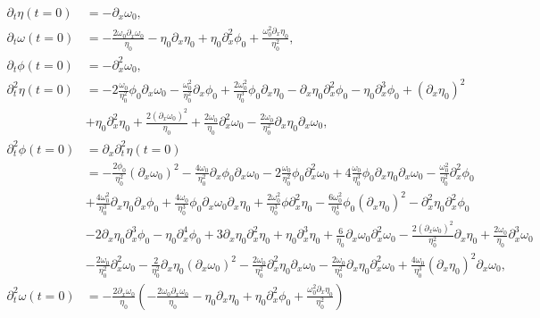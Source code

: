 \documentclass[reqno,11pt]{amsart}
\theoremstyle{plain}
\theoremstyle{definition}
\numberwithin{equation}{section}
\begin{document}
\begin{equation}
\label{initial_data_time}
\begin{aligned}
    \partial_t \eta(t=0) & = - \partial_x \omega_0,\\
    \partial_t \omega(t=0) &= - \frac{2\omega_0\partial_x \omega_0}{\eta_0}  - \eta_0 \partial_x \eta_0 + \eta_0 \partial_{x}^2 \phi_0 + \frac{\omega_0^2 \partial_x \eta_0}{\eta_0^2}, \\ 
    \partial_t \phi (t=0) & = - \partial_x^2 \omega_0, \\
    \partial_t^2 \eta(t=0) &= -2\frac{\omega_0 }{\eta_0^2} \phi_0\partial_x \omega_0-\frac{\omega_0^2}{\eta_0^2 }\partial_x \phi_0+\frac{2\omega_0^2}{\eta_0^3}\phi_0\partial_x\eta_0-\partial_x\eta_0 \partial_x^2\phi_0-\eta_0\partial_x^3 \phi_0+(\partial_x\eta_0)^2  \\
    & +\eta_0\partial_x^2 \eta_0+\frac{2(\partial_x\omega_0)^2}{\eta_0}+\frac{2\omega_0}{\eta_0}\partial_x^2 \omega_0-\frac{2\omega_0}{\eta_0^2 } \partial_x \eta_0\partial_x \omega_0, \\
     \partial_t^2 \phi (t=0) &= \partial_x \partial_t^2 \eta(t=0) \\
     & = -\frac{2\phi_0}{\eta_0^2 } (\partial_x \omega_0)^2 -\frac{4\omega_0}{\eta_0^2 } \partial_x \phi_0 \partial_x \omega_0-2\frac{\omega_0}{\eta_0^2 } \phi_0\partial_x^2 \omega_0+4\frac{\omega_0}{\eta_0^3} \phi_0\partial_x \eta_0 \partial_x \omega_0 -\frac{\omega_0^2}{\eta_0^2}\partial_x^2 \phi_0\\
     &+\frac{4\omega_0^2}{\eta_0^3} \partial_x \eta_0\partial_x \phi_0+\frac{4\omega_0}{\eta_0^3}\phi_0\partial_x \omega_0\partial_x \eta_0+\frac{2\omega_0^2}{\eta_0^3}\phi \partial_x^2 \eta_0 -\frac{6\omega_0^2}{\eta_0^4}\phi_0 (\partial_x \eta_0)^2-\partial_x^2\eta_0 \partial_x^2 \phi_0\\
     & -2\partial_x \eta_0 \partial_x^3 \phi_0-\eta_0\partial_x^4 \phi_0+3\partial_x\eta_0\partial_x^2\eta_0+\eta_0\partial_x^3 \eta_0+\frac{6}{\eta_0}\partial_x\omega_0\partial_x^2\omega_0-\frac{2(\partial_x\omega_0)^2}{\eta_0^2}\partial_x\eta_0+\frac{2\omega_0}{\eta_0}\partial_x^3\omega_0 \\
     & -\frac{2\omega_0}{\eta_0^2}\partial_x^2 \omega_0-\frac{2}{\eta_0^2}\partial_x\eta_0 (\partial_x\omega_0)^2-\frac{2\omega_0}{\eta_0^2}\partial_x^2\eta_0\partial_x \omega_0-\frac{2\omega_0}{\eta_0^2}\partial_x\eta_0\partial_x^2 \omega_0+\frac{4\omega_0}{\eta_0^3}(\partial_x \eta_0)^2 \partial_x \omega_0,\\
     \partial_t^2 \omega (t=0) &=-\frac{2\partial_x \omega_0}{\eta_0}\left(- \frac{2\omega_0\partial_x \omega_0}{\eta_0}  - \eta_0 \partial_x \eta_0 + \eta_0 \partial_{x}^2 \phi_0 + \frac{\omega_0^2 \partial_x \eta_0}{\eta_0^2}\right)\\

\end{aligned}
\end{equation}
\end{document}
